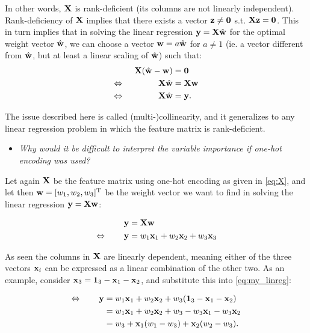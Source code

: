 In other words, $\mathbf{X}$ is rank-deficient (its columns are not linearly
independent). Rank-deficiency of $\mathbf{X}$ implies that there exists a vector
$\mathbf{z} \neq \mathbf{0}$ s.t. $\mathbf{Xz} = \mathbf{0}$. This in turn implies that in
solving the linear regression $\mathbf{y} = \mathbf{X} \hat{\mathbf{w}}$ for the optimal
weight vector $\hat{\mathbf{w}}$, we can choose a vector $\mathbf{w} = a
\hat{\mathbf{w}}$ for $a \neq 1$ (ie. a vector different from $\hat{\mathbf{w}}$, but
at least a linear scaling of $\hat{\mathbf{w}}$) such that:
\begin{alignat*}{3}
  \mathbf{X}(\hat{\mathbf{w}} - \mathbf{w}) &= \mathbf{0}\\
  \Leftrightarrow\qquad\qquad \mathbf{X} \hat {\mathbf{w}} &= \mathbf{Xw}\\
  \Leftrightarrow\qquad\qquad \mathbf{X} \hat{\mathbf{w}} &= \mathbf{y}.
\end{alignat*}

The issue described here is called (multi-)collinearity, and it generalizes to
any linear regression problem in which the feature matrix is rank-deficient.

\begin{itemize}
  \item \textit{Why would it be difficult to interpret the variable importance
    if one-hot encoding was used?}
\end{itemize}

Let again $\mathbf{X}$ be the feature matrix using one-hot encoding as given in
\cref{eq:X}, and let then $\mathbf{w} = [w_1, w_2, w_3]^{\text{T}}$ be the weight
vector we want to find in solving the linear regression $\mathbf{y} = \mathbf{X} \mathbf{w}$:

\begin{align}
  \mathbf{y} &= \mathbf{X} \mathbf{w}\nonumber\\
  \Leftrightarrow\qquad \mathbf{y} &= w_1 \mathbf{x}_1 + w_2 \mathbf{x}_2 +  w_3\mathbf{x}_3\label{eq:my_linreg}
\end{align}

As seen the columns in $\mathbf{X}$ are linearly dependent, meaning either of the
three vectors $\mathbf{x}_i$ can be expressed as a linear combination of the other
two. As an example, consider $\mathbf{x}_3 = \mathbf{1}_3 - \mathbf{x}_1 - \mathbf{x}_2$, and
substitute this into \cref{eq:my_linreg}:

\begin{align*}
  \Leftrightarrow\qquad \mathbf{y} &= w_1 \mathbf{x}_1 + w_2 \mathbf{x}_2 +
  w_3(\mathbf{1}_3 - \mathbf{x}_1 - \mathbf{x}_2)\\
                               &= w_1 \mathbf{x}_1 + w_2 \mathbf{x}_2 +
  w_3 - w_3 \mathbf{x}_1 - w_3 \mathbf{x}_2\\
  &= w_3 + \mathbf{x}_1 (w_1 - w_3) + \mathbf{x}_2 (w_2 - w_3).
\end{align*}


